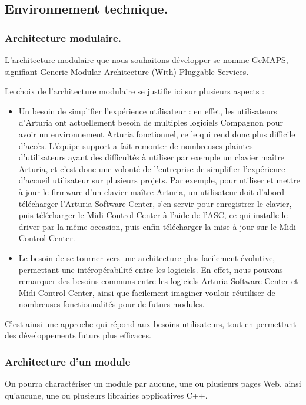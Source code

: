 \documentclass[francais]{rapportPFE}  %
\begin{document}
\subsection{Environnement technique.}

\subsubsection{Architecture modulaire.}
L'architecture modulaire que nous souhaitons développer se nomme GeMAPS, signifiant Generic Modular Architecture (With) Pluggable Services. 

Le choix de l'architecture modulaire se justifie ici sur plusieurs aspects : 
\begin{itemize}
    \item Un besoin de simplifier l'expérience utilisateur : en effet, les utilisateurs d'Arturia ont actuellement besoin de multiples logiciels Compagnon pour avoir un environnement Arturia fonctionnel, ce le qui rend donc plus difficile d'accès. L'équipe support a fait remonter de nombreuses plaintes d'utilisateurs ayant des difficultés à utiliser par exemple un clavier maître Arturia, et c'est donc une volonté de l'entreprise de simplifier l'expérience d'accueil utilisateur sur plusieurs projets. Par exemple, pour utiliser et mettre à jour le firmware d'un clavier maître Arturia, un utilisateur doit d'abord télécharger l'Arturia Software Center, s'en servir pour enregistrer le clavier, puis télécharger le Midi Control Center à l'aide de l'ASC, ce qui installe le driver par la même occasion, puis enfin télécharger la mise à jour sur le Midi Control Center.
    \item Le besoin de se tourner vers une architecture plus facilement évolutive, permettant une intéropérabilité entre les logiciels. En effet, nous pouvons remarquer des besoins communs entre les logiciels Arturia Software Center et Midi Control Center, ainsi que facilement imaginer vouloir réutiliser de nombreuses fonctionnalités pour de futurs modules.
\end{itemize}
C'est ainsi une approche qui répond aux besoins utilisateurs, tout en permettant des développements futurs plus efficaces.

\subsubsection{Architecture d'un module}

On pourra charactériser un module par aucune, une ou plusieurs pages Web, ainsi qu'aucune, une ou plusieurs librairies applicatives C++.
\end{document}
